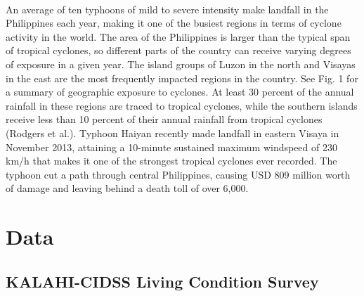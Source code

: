 \documentclass[12pt]{article}
\begin{document}
	\paragraph{ } An average of ten typhoons of mild to severe intensity make landfall in the Philippines each year, making it one of the busiest regions in terms of cyclone activity in the world. The area of the Philippines is larger than the typical span of tropical cyclones, so different parts of the country can receive varying degrees of exposure in a given year.
	The island groups of Luzon in the north and Visayas in the east are the most frequently impacted regions in the country. See Fig. 1 for a summary of geographic exposure to cyclones. At least 30 percent of the annual rainfall in these regions are traced to tropical cyclones, while the southern islands receive less than 10 percent of their annual rainfall from tropical cyclones (Rodgers et al.). Typhoon Haiyan recently made landfall in eastern Visaya in November 2013, attaining a 10-minute sustained maximum windspeed of 230 km/h that makes it one of the strongest tropical cyclones ever recorded. The typhoon cut a path through central Philippines, causing USD 809 million worth of damage and leaving behind a death toll of over 6,000.  




\section{Data}

	\subsection{KALAHI-CIDSS Living Condition Survey}
\end{document}
